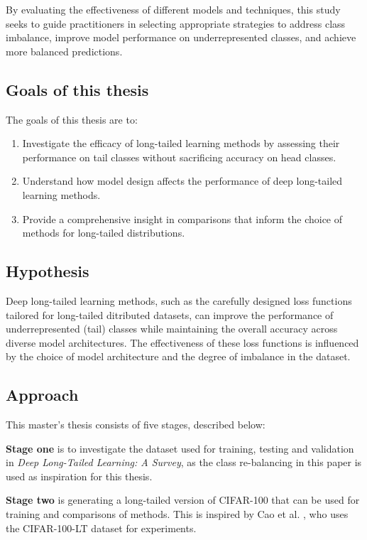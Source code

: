 By evaluating the effectiveness of different models and techniques, this study seeks to guide practitioners in selecting appropriate strategies to address class imbalance, improve model performance on underrepresented classes, and achieve more balanced predictions.


\subsection{Goals of this thesis}
\label{sec:goals}
The goals of this thesis are to:

\begin{enumerate}
    \item Investigate the efficacy of long-tailed learning methods by assessing their performance on tail classes without sacrificing accuracy on head classes. 
    \item Understand how model design affects the performance of deep long-tailed learning methods.
    \item Provide a comprehensive insight in comparisons that inform the choice of methods for long-tailed distributions.
\end{enumerate}

\subsection{Hypothesis}
Deep long-tailed learning methods, such as the carefully designed loss functions tailored for long-tailed ditributed datasets, can improve the performance of underrepresented (tail) classes while maintaining the overall accuracy across diverse model architectures. The effectiveness of these loss functions is influenced by the choice of model architecture and the degree of imbalance in the dataset.


\subsection{Approach}
This master's thesis consists of five stages, described below:  
\vspace{1em}

\noindent \textbf{Stage one} is to investigate the dataset used for training, testing and validation in \textit{Deep Long-Tailed Learning: A Survey}, as the class re-balancing in this paper is used as inspiration for this thesis.
\vspace{1em}

\noindent \textbf{Stage two} is generating a long-tailed version of CIFAR-100 that can be used for training and comparisons of methods. This is inspired by Cao et al. \cite{cao2019learningimbalanceddatasetslabeldistributionaware}, who uses the CIFAR-100-LT dataset for experiments.
\vspace{1em}

